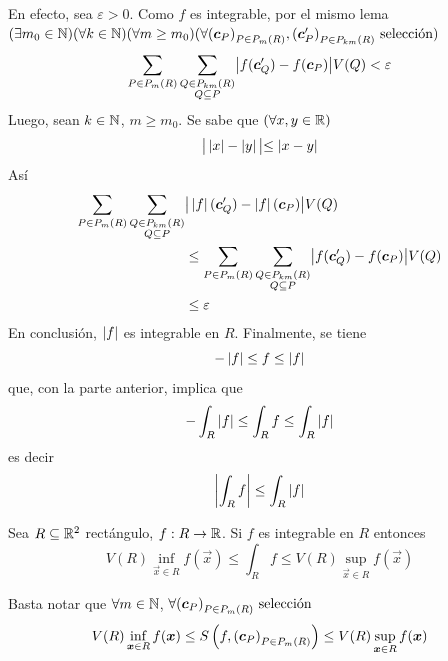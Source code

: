 \begin{demostracion}
\begin{enumerate}
    En
    efecto, sea $ \varepsilon > 0 $. Como $ f $ es integrable, por el mismo lema
    \\$( \exists  m_0\in \N) ( \forall  k\in \N)
        ( \forall m \geq m_0 )
        ( \forall \feleccion{{(\vec{c}_P)}_{P \in \ep{m}{R}}, {(\vec{c}'_P)}_{P \in \ep{km}{R}}} %
         ) $
        \[ \sum_{P \in P_{m}(R)}
            \sum_{\substack{Q \in P_{km}(R) \\ Q \subseteq P}}
            \bigr\lvert f(\boldsymbol{c}'_Q)-f(\boldsymbol{c}_P) \bigl\rvert V(Q)
        < \varepsilon \]
    Luego, sean $k\in \mathbb{N} $, $ m \geq m_0 $. Se sabe que $
    (\forall x,y \in \mathbb{R}) $
        \[ \bigr\lvert\left\lvert x\right\rvert - \left\lvert y\right\rvert\bigl\rvert \leq \left\lvert x - y\right\rvert \]
    As\'i
    \begin{align*}
        \sum_{P \in P_{m}(R)}
            \sum_{\substack{Q \in P_{km}(R) \\ Q \subseteq P}}
                &\bigr\lvert \left\lvert f\right\rvert(\boldsymbol{c}'_Q)-\left\lvert f\right\rvert(\boldsymbol{c}_P) \bigl\rvert V(Q) \\
        &\leq \sum_{P \in P_{m}(R)}
            \sum_{\substack{Q \in P_{km}(R) \\ Q \subseteq P}}
                \bigr\lvert f(\boldsymbol{c}'_Q)-f(\boldsymbol{c}_P) \bigl\rvert V(Q) \\
        &\leq \varepsilon
    \end{align*}
    En conclusi\'on, $ \left\lvert f\right\rvert $ es integrable en $ R $. Finalmente,
    se tiene
        \[ -\left\lvert f\right\rvert \leq f \leq \left\lvert f\right\rvert \]
    que, con la parte anterior, implica que
        \[ -\int_R \left\lvert f\right\rvert \leq \int_R f \leq \int_R \left\lvert f\right\rvert \]
    es decir
        \[ \left\lvert \int_R f \right\rvert \leq \int_R \left\lvert f\right\rvert \]
\end{enumerate}

\end{demostracion}

\begin{proposicion}\label{pro:estimacion}
Sea $ R \subseteq \mathbb{R}^2 $ rect\'angulo, $f : R \to \mathbb{R}$. Si $ f $ es
integrable en $ R $ entonces
    \[ V(R) \inf_{\vec{x} \in R} f(\vec{x}) \leq \int_R f \leq V(R) \sup_{\vec{x} \in R} f(\vec{x})\]
\end{proposicion}

\begin{demostracion}
Basta notar que $ \forall  m\in \mathbb{N}$, $\forall
{(\boldsymbol{c}_P)}_{P \in P_{m}(R)} \allowbreak \text{ selecci\'on}$
    \[ V(R) \inf_{\boldsymbol{x} \in R} f(\boldsymbol{x})
        \leq S\left(f, {(\boldsymbol{c}_P)}_{P \in P_{m}(R)}\right)
        \leq V(R) \sup_{\boldsymbol{x} \in R} f(\boldsymbol{x})\]
\end{demostracion}

